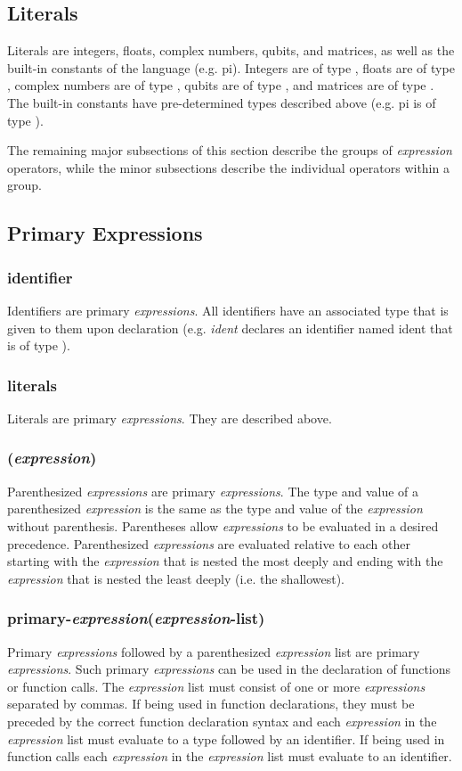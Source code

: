 
\subsection{Literals}
Literals are integers, floats, complex numbers, qubits, and matrices, as well as the built-in constants of the language (e.g. \textsf{pi}). Integers are of type \integ, floats are of type \float, complex numbers are of type \complex, qubits are of type \qubit, and matrices are of type \mat. The built-in constants have pre-determined types described above (e.g. \textsf{pi} is of type \float).

The remaining major subsections of this section describe the groups of \textit{expression} operators, while the minor subsections describe the individual operators within a group.
\subsection{Primary Expressions}
\subsubsection{identifier}
Identifiers are primary \textit{expressions}. All identifiers have an associated type that is given to them upon declaration (e.g. \float \textit{ident} declares an identifier named ident that is of type \float).
\subsubsection{literals}
Literals are primary \textit{expressions}. They are described above.
\subsubsection{(\textit{expression})}
Parenthesized \textit{expressions} are primary \textit{expressions}. The type and value of a parenthesized \textit{expression} is the same as the type and value of the \textit{expression} without parenthesis. Parentheses allow \textit{expressions} to be evaluated in a desired precedence. Parenthesized \textit{expressions} are evaluated relative to each other starting with the \textit{expression} that is nested the most deeply and ending with the \textit{expression} that is nested the least deeply (i.e. the shallowest).
\subsubsection{primary-\textit{expression}(\textit{expression}-list)}
Primary \textit{expressions} followed by a parenthesized \textit{expression} list are primary \textit{expressions}. Such primary \textit{expressions} can be used in the declaration of functions or function calls. The \textit{expression} list must consist of one or more \textit{expressions} separated by commas. If being used in function declarations, they must be preceded by the correct function declaration syntax and each \textit{expression} in the \textit{expression} list must evaluate to a type followed by an identifier. If being used in function calls each \textit{expression} in the \textit{expression} list must evaluate to an identifier.
